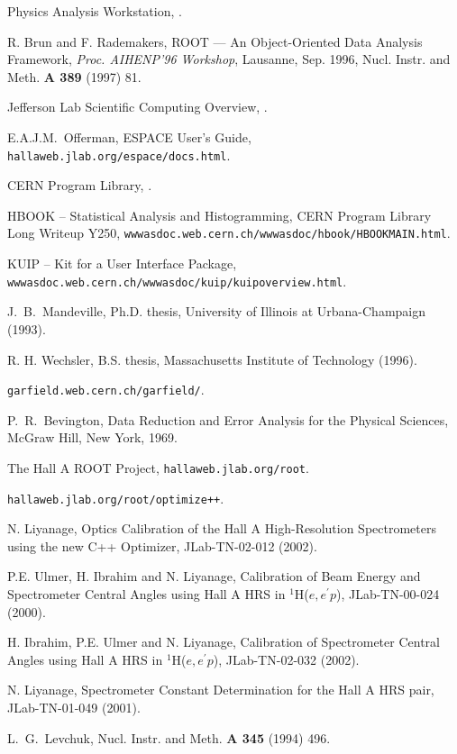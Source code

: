 \begin{thebibliography}{99}
 Physics Analysis Workstation,       
. 

 R. Brun and F.  Rademakers, 
\newblock ROOT --- An Object-Oriented Data Analysis 
Framework, {\it Proc. AIHENP'96 Workshop}, Lausanne, Sep.  1996, 
Nucl. Instr. and Meth. {\bf A 389} (1997) 81.

 Jefferson Lab Scientific Computing Overview,      
.

 E.A.J.M.~Offerman,
\newblock ESPACE User's Guide, {\tt hallaweb.jlab.org/espace/docs.html}.

 CERN Program Library,      
. 

 HBOOK -- Statistical Analysis and Histogramming, 
\newblock CERN Program Library Long Writeup Y250,      
{\tt wwwasdoc.web.cern.ch/wwwasdoc/hbook/HBOOKMAIN.html}.

 KUIP -- Kit for a User Interface Package, 
\newblock
{\tt wwwasdoc.web.cern.ch/wwwasdoc/kuip/kuipoverview.html}.

J.\ B.\ Mandeville, 
\newblock Ph.D. thesis, University of Illinois at 
Urbana-Champaign (1993).

 R. H.  Wechsler,
\newblock B.S. thesis, Massachusetts Institute 
of Technology (1996).

 {\tt garfield.web.cern.ch/garfield/}.

 P.~R.~Bevington,
\newblock Data Reduction and Error Analysis for the Physical 
Sciences, McGraw Hill, New York, 1969.

 The 
Hall A ROOT Project, {\tt hallaweb.jlab.org/root}.

 {\tt hallaweb.jlab.org/root/optimize++}.

  N. Liyanage,
\newblock Optics Calibration of the Hall 
A High-Resolution Spectrometers using the new C++ Optimizer, 
JLab-TN-02-012 (2002).

 P.E. Ulmer, H. Ibrahim and N. Liyanage, 
\newblock Calibration of Beam Energy and Spectrometer Central Angles using Hall
A HRS in $^1$H($e,e^\prime p$), JLab-TN-00-024 (2000).

 H. Ibrahim, P.E. Ulmer and N. Liyanage, 
\newblock Calibration of Spectrometer Central Angles using Hall A HRS in
$^1$H($e,e^\prime p$), JLab-TN-02-032 (2002).

  N. Liyanage, 
\newblock Spectrometer Constant Determination for the Hall A HRS pair, 
JLab-TN-01-049 (2001).

L.~G.~Levchuk,
\newblock Nucl. Instr. and Meth. {\bf A 345} (1994) 496.
\end{thebibliography}

